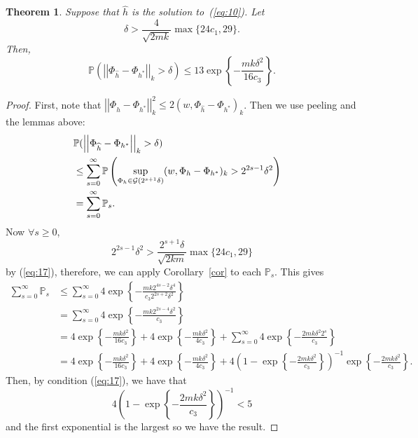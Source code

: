\documentclass[11pt]{article}
\newtheorem{theorem}{Theorem}[section]
\renewcommand{\P}{\mathbb{P}}
\renewcommand{\eqref}[1]{(\ref{eq:#1})}
\newcommand{\vnorm}[1]{\left|\left| #1 \right|\right|}
\begin{document}
\begin{theorem}
  \label{thm:emp}
  Suppose that $\widehat{h}$ is the solution to~\eqref{10}. Let
  \begin{equation}%
    \delta>\frac{4}{\sqrt{2mk}}\max\{24c_1,29\}.\label{eq:17}
 \end{equation} Then,
  \begin{equation*}
    \label{eq:4}
    \P(\vnorm{\Phi_{\widehat{h}}- \Phi_{h^*}}_k > \delta) \leq
    13\exp\left\{-\frac{mk\delta^2}{16c_3}\right\}. 
  \end{equation*}
\end{theorem}
\begin{proof}
  First, note that $\vnorm{\Phi_{\widehat{h}} - \Phi_{h^*}}_k^2 \leq
  2(w,\Phi_{\widehat{h}} - \Phi_{h^*})_k$.  Then we use peeling and the lemmas
  above:
  \begin{align*}
    \label{eq:8b}
    \lefteqn{\P(\vnorm{\Phi_{\widehat{h}} - \Phi_{h^*}}_k > \delta)}\nonumber\\ & \leq \sum_{s=0}^\infty
    \P\left( \sup_{\Phi_h \in \mathcal{G}(2^{s+1}\delta)} (w, \Phi_h-\Phi_{h^*})_k >
      2^{2s-1}\delta^2\right)\\
    &= \sum_{s=0}^\infty \P_s.
  \end{align*}
  Now $\forall s \geq 0$, $$2^{2s-1}\delta^2 >
  \frac{2^{s+1}\delta}{\sqrt{2km}}\max\{24c_1,29\}$$ by (\ref{eq:17}),
  therefore, we can apply Corollary~\ref{cor} to each $\P_s$. This gives
  \begin{align*}
    \sum_{s=0}^\infty \P_s & \leq \sum_{s=0}^\infty 4 \exp \left\{ -
      \frac{mk2^{4s-2}\delta^4}{c_3 2^{2s+2}\delta^2} \right\}\\
    & = \sum_{s=0}^\infty 4 \exp \left\{ - \frac{mk2^{2s-4}\delta^2}{c_3}
    \right\}\\
    & = 4\exp\left\{-\frac{mk\delta^2}{16c_3}\right\} +
    4\exp\left\{-\frac{mk\delta^2}{4c_3}\right\} + \sum_{s=0}^\infty
    4\exp\left\{-\frac{2mk\delta^2 2^s}{c_3}\right\}\\ 
    & = 4\exp\left\{-\frac{mk\delta^2}{16c_3}\right\} + 4 \exp\left\{
      -\frac{mk\delta^2}{4c_3}\right\}  
    + 4\left(1- 
      \exp\left\{-\frac{2mk\delta^2}{c_3}\right\}\right)^{-1}
    \exp\left\{-\frac{2mk\delta^2}{c_3}\right\}.  
  \end{align*}
  Then, by condition (\ref{eq:17}), we have that
  $$4\left(1- \exp\left\{-\frac{2mk\delta^2}{c_3}\right\}\right)^{-1}<5$$ and the first exponential is the largest
  so we have the result.
\end{proof}
\end{document}
